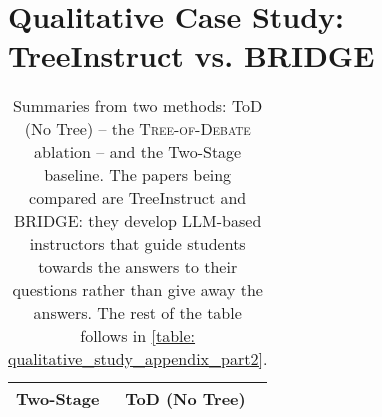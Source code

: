 \section{Qualitative Case Study: TreeInstruct vs. BRIDGE}
\label{appendix:summary}
\begin{table*}[]
    \centering
    \caption{Summaries from two methods: ToD (No Tree) -- the \textsc{Tree-of-Debate} ablation -- and the Two-Stage baseline. The papers being compared are TreeInstruct and BRIDGE: they develop LLM-based instructors that guide students towards the answers to their questions rather than give away the answers. The rest of the table follows in \ref{table: qualitative_study_appendix_part2}.}
    \begin{tabular}{|p{8cm}|p{8cm}|}
        \toprule
        \textbf{Two-Stage} & \textbf{ToD (No Tree)} \\
        \midrule

\end{tabular}
\end{table*}
